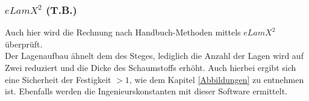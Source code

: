 \subsubsection{$eLamX^{2}$ (T.B.)}

Auch hier wird die Rechnung nach Handbuch-Methoden mittels $eLamX^{2}$ überprüft. \\

\noindent Der Lagenaufbau ähnelt dem des Steges, lediglich die Anzahl der Lagen wird auf Zwei reduziert und die Dicke des Schaumstoffs erhöht. Auch hierbei ergibt sich eine Sicherheit der Festigkeit $>1$, wie dem Kapitel \ref{Abbildungen} zu entnehmen ist. Ebenfalls werden die Ingenieurskonstanten mit dieser Software ermittelt.